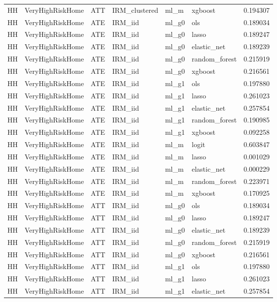 \begin{longtable}{llllllr}
HH & VeryHighRiskHome & ATT & IRM\_clustered & ml\_m & xgboost & 0.194307 \\
HH & VeryHighRiskHome & ATE & IRM\_iid & ml\_g0 & ols & 0.189034 \\
HH & VeryHighRiskHome & ATE & IRM\_iid & ml\_g0 & lasso & 0.189247 \\
HH & VeryHighRiskHome & ATE & IRM\_iid & ml\_g0 & elastic\_net & 0.189239 \\
HH & VeryHighRiskHome & ATE & IRM\_iid & ml\_g0 & random\_forest & 0.215919 \\
HH & VeryHighRiskHome & ATE & IRM\_iid & ml\_g0 & xgboost & 0.216561 \\
HH & VeryHighRiskHome & ATE & IRM\_iid & ml\_g1 & ols & 0.197880 \\
HH & VeryHighRiskHome & ATE & IRM\_iid & ml\_g1 & lasso & 0.261023 \\
HH & VeryHighRiskHome & ATE & IRM\_iid & ml\_g1 & elastic\_net & 0.257854 \\
HH & VeryHighRiskHome & ATE & IRM\_iid & ml\_g1 & random\_forest & 0.190985 \\
HH & VeryHighRiskHome & ATE & IRM\_iid & ml\_g1 & xgboost & 0.092258 \\
HH & VeryHighRiskHome & ATE & IRM\_iid & ml\_m & logit & 0.603847 \\
HH & VeryHighRiskHome & ATE & IRM\_iid & ml\_m & lasso & 0.001029 \\
HH & VeryHighRiskHome & ATE & IRM\_iid & ml\_m & elastic\_net & 0.000229 \\
HH & VeryHighRiskHome & ATE & IRM\_iid & ml\_m & random\_forest & 0.223971 \\
HH & VeryHighRiskHome & ATE & IRM\_iid & ml\_m & xgboost & 0.170925 \\
HH & VeryHighRiskHome & ATT & IRM\_iid & ml\_g0 & ols & 0.189034 \\
HH & VeryHighRiskHome & ATT & IRM\_iid & ml\_g0 & lasso & 0.189247 \\
HH & VeryHighRiskHome & ATT & IRM\_iid & ml\_g0 & elastic\_net & 0.189239 \\
HH & VeryHighRiskHome & ATT & IRM\_iid & ml\_g0 & random\_forest & 0.215919 \\
HH & VeryHighRiskHome & ATT & IRM\_iid & ml\_g0 & xgboost & 0.216561 \\
HH & VeryHighRiskHome & ATT & IRM\_iid & ml\_g1 & ols & 0.197880 \\
HH & VeryHighRiskHome & ATT & IRM\_iid & ml\_g1 & lasso & 0.261023 \\
HH & VeryHighRiskHome & ATT & IRM\_iid & ml\_g1 & elastic\_net & 0.257854 \\

\end{longtable}
